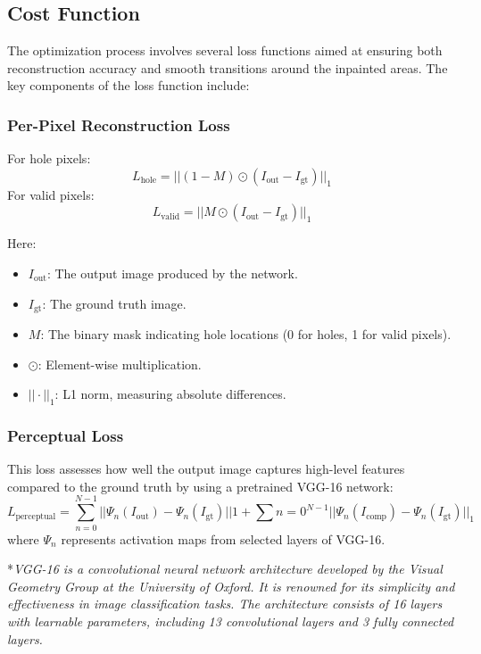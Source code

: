 \documentclass{article}
\begin{document}
\subsection*{Cost Function}

The optimization process involves several loss functions aimed at ensuring both reconstruction accuracy and smooth transitions around the inpainted areas. The key components of the loss function include:

\subsubsection*{Per-Pixel Reconstruction Loss}
For hole pixels:
\[
L_{\text{hole}} = ||(1 - M) \odot (I_{\text{out}} - I_{\text{gt}})||_1
\]
For valid pixels:
\[
L_{\text{valid}} = ||M \odot (I_{\text{out}} - I_{\text{gt}})||_1
\]

Here:
\begin{itemize} 

\item  \( I_{\text{out}} \): The output image produced by the network.
\item  \( I_{\text{gt}} \): The ground truth image.
\item  \( M \): The binary mask indicating hole locations (0 for holes, 1 for valid pixels).
\item  \( \odot \): Element-wise multiplication.
\item  \( ||\cdot||_1 \): L1 norm, measuring absolute differences.
\end{itemize}

\subsubsection*{Perceptual Loss}
This loss assesses how well the output image captures high-level features compared to the ground truth by using a pretrained VGG-16 network:
\[
L_{\text{perceptual}} = \sum_{n=0}^{N-1} ||\Psi_n(I_{\text{out}}) - \Psi_n(I_{\text{gt}})||1 + \sum{n=0}^{N-1} ||\Psi_n(I_{\text{comp}}) - \Psi_n(I_{\text{gt}})||_1
\]
where \( \Psi_n \) represents activation maps from selected layers of VGG-16.
\vspace{2mm}

*\textit{VGG-16 is a convolutional neural network architecture developed by the Visual Geometry Group at the University of Oxford. It is renowned for its simplicity and effectiveness in image classification tasks. The architecture consists of 16 layers with learnable parameters, including 13 convolutional layers and 3 fully connected layers.}
\end{document}
